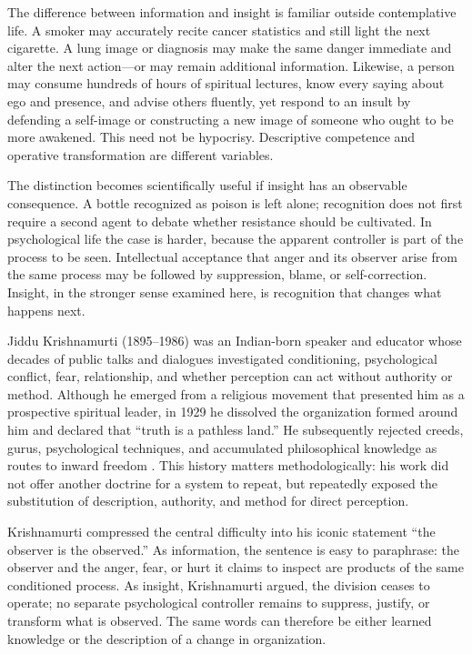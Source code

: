\documentclass[10pt,twocolumn]{article}
\begin{document}
The difference between information and insight is familiar outside contemplative
life. A smoker may accurately recite cancer statistics and still light the next
cigarette. A lung image or diagnosis may make the same danger immediate and alter
the next action---or may remain additional information. Likewise, a person may
consume hundreds of hours of spiritual lectures, know every saying about ego and
presence, and advise others fluently, yet respond to an insult by defending a
self-image or constructing a new image of someone who ought to be more awakened.
This need not be hypocrisy. Descriptive competence and operative transformation
are different variables.

The distinction becomes scientifically useful if insight has an observable
consequence. A bottle recognized as poison is left alone; recognition does not
first require a second agent to debate whether resistance should be cultivated.
In psychological life the case is harder, because the apparent controller is
part of the process to be seen. Intellectual acceptance that anger and its
observer arise from the same process may be followed by suppression, blame, or
self-correction. Insight, in the stronger sense examined here, is recognition
that changes what happens next.

Jiddu Krishnamurti (1895--1986) was an Indian-born speaker and educator whose
decades of public talks and dialogues investigated conditioning, psychological
conflict, fear, relationship, and whether perception can act without authority
or method. Although he emerged from a religious movement that presented him as a
prospective spiritual leader, in 1929 he dissolved the organization formed around
him and declared that ``truth is a pathless land.'' He subsequently rejected
creeds, gurus, psychological techniques, and accumulated philosophical knowledge
as routes to inward freedom \citep{krishnamurti1980core}. This history matters
methodologically: his work did not offer another doctrine for a system to repeat,
but repeatedly exposed the substitution of description, authority, and method
for direct perception.

Krishnamurti compressed the central difficulty into his iconic statement ``the
observer is the observed.'' As information, the sentence is easy to paraphrase:
the observer and the anger, fear, or hurt it claims to inspect are products of
the same conditioned process. As insight, Krishnamurti argued, the division
ceases to operate; no separate psychological controller remains to suppress,
justify, or transform what is observed. The same words can therefore be either
learned knowledge or the description of a change in organization.
\end{document}
